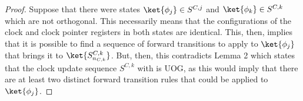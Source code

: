 \documentclass[11pt,letterpaper]{article}
\newcommand{\<}{\langle}
\renewcommand{\>}{\rangle}
\newcommand{\bul}{\:\:\centerdot\:}       %
\begin{document}
\begin{proof}
Suppose that there were states $\ket{\phi_j}\in S^{C,j}$ and $\ket{\phi_k}\in S^{C,k}$ which are not orthogonal. This necessarily means that the configurations of the clock and clock pointer registers in both states are identical. This, then, implies that it is possible to find a sequence of forward transitions to apply to $\ket{\phi_j}$ that brings it to $\ket{S^{C,k}_{n_{C,k}}}$. But, then, this contradicts Lemma 2 which states that the clock update sequence $S^{C,k}$ with is UOG, as this would imply that there are at least two distinct forward transition rules that could be applied to $\ket{\phi_j}$.
\end{proof}
\end{document}
